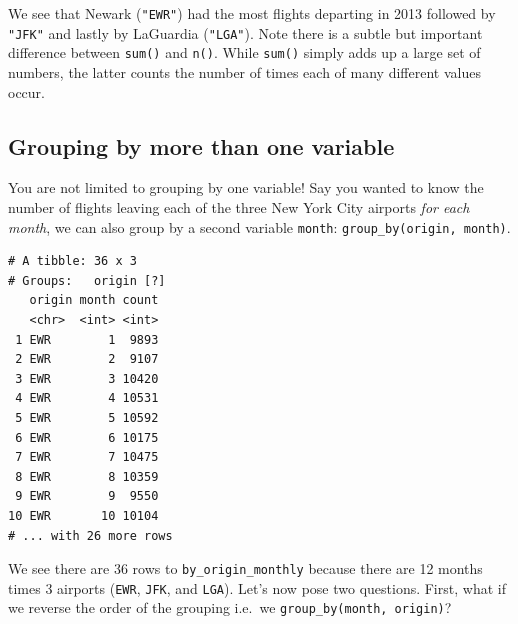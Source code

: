 \documentclass[12pt,]{krantz}
\makeatletter
\newenvironment{Shaded}{\begin{snugshade}}{\end{snugshade}}
\newcommand{\KeywordTok}[1]{\textcolor[rgb]{0.27,0.27,0.27}{\textbf{#1}}}
\newcommand{\DataTypeTok}[1]{\textcolor[rgb]{0.27,0.27,0.27}{#1}}
\newcommand{\StringTok}[1]{\textcolor[rgb]{0.5,0.5,0.5}{#1}}
\newcommand{\OperatorTok}[1]{\textcolor[rgb]{0.43,0.43,0.43}{\textbf{#1}}}
\newcommand{\NormalTok}[1]{#1}
\newenvironment{kframe}{%
\medskip{}
\setlength{\fboxsep}{.8em}
 \def\at@end@of@kframe{}%
 \ifinner\ifhmode%
  \def\at@end@of@kframe{\end{minipage}}%
  \begin{minipage}{\columnwidth}%
 \fi\fi%
 \def\FrameCommand##1{\hskip\@totalleftmargin \hskip-\fboxsep
 \colorbox{shadecolor}{##1}\hskip-\fboxsep
     \hskip-\linewidth \hskip-\@totalleftmargin \hskip\columnwidth}%
 \MakeFramed {\advance\hsize-\width
   \@totalleftmargin\z@ \linewidth\hsize
   \@setminipage}}%
 {\par\unskip\endMakeFramed%
 \at@end@of@kframe}
\renewenvironment{Shaded}{\begin{kframe}}{\end{kframe}}
\theoremstyle{definition}
\theoremstyle{definition}
\theoremstyle{definition}
\theoremstyle{remark}
\makeatother
\begin{document}
We see that Newark (\texttt{"EWR"}) had the most flights departing in
2013 followed by \texttt{"JFK"} and lastly by LaGuardia
(\texttt{"LGA"}). Note there is a subtle but important difference
between \texttt{sum()} and \texttt{n()}. While \texttt{sum()} simply
adds up a large set of numbers, the latter counts the number of times
each of many different values occur.

\subsection{Grouping by more than one
variable}\label{grouping-by-more-than-one-variable}

You are not limited to grouping by one variable! Say you wanted to know
the number of flights leaving each of the three New York City airports
\emph{for each month}, we can also group by a second variable
\texttt{month}: \texttt{group\_by(origin,\ month)}.

\begin{Shaded}
\end{Shaded}

\begin{verbatim}
# A tibble: 36 x 3
# Groups:   origin [?]
   origin month count
   <chr>  <int> <int>
 1 EWR        1  9893
 2 EWR        2  9107
 3 EWR        3 10420
 4 EWR        4 10531
 5 EWR        5 10592
 6 EWR        6 10175
 7 EWR        7 10475
 8 EWR        8 10359
 9 EWR        9  9550
10 EWR       10 10104
# ... with 26 more rows
\end{verbatim}

We see there are 36 rows to \texttt{by\_origin\_monthly} because there
are 12 months times 3 airports (\texttt{EWR}, \texttt{JFK}, and
\texttt{LGA}). Let's now pose two questions. First, what if we reverse
the order of the grouping i.e.~we \texttt{group\_by(month,\ origin)}?

\begin{Shaded}
\end{Shaded}
\end{document}
